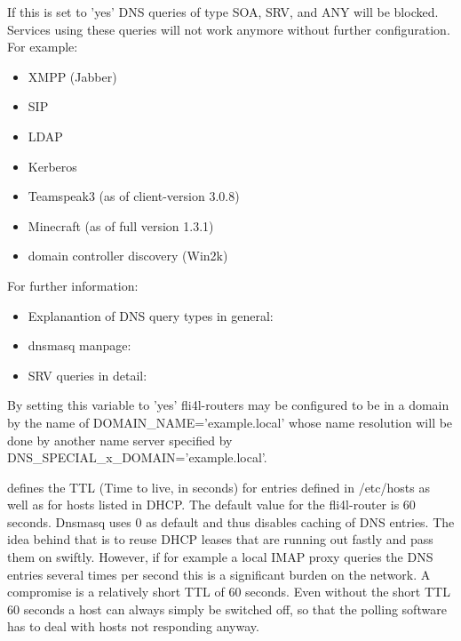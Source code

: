 \begin{description}
     {If this is set to 'yes' DNS queries of type SOA, SRV, and ANY will be
     blocked. Services using these queries will not work anymore without further
     configuration.\hfil\break
     For example:
     \begin{itemize}
     \item XMPP (Jabber)
     \item SIP
     \item LDAP
     \item Kerberos
     \item Teamspeak3 (as of client-version 3.0.8)
     \item Minecraft (as of full version 1.3.1)
     \item domain controller discovery (Win2k)
     \end{itemize}
     For further information:}
     \begin{itemize}
     \item Explanantion of DNS query types in general:\hfil\break
     \item dnsmasq manpage:\hfil\break
     \item SRV queries in detail:\hfil\break
     \end{itemize}


     {By setting this variable to 'yes' fli4l-routers may be configured to be in
     a domain by the name of DOMAIN\_NAME='example.local' whose name resolution will
     be done by another name server specified by DNS\_SPECIAL\_x\_DOMAIN='example.local'.}


     {defines the TTL (Time to live, in seconds) for entries defined
     in /etc/hosts as well as for hosts listed in DHCP. The default value
     for the fli4l-router is 60 seconds. Dnsmasq uses 0 as default and thus
     disables caching of DNS entries. The idea behind that is to reuse DHCP
     leases that are running out fastly and pass them on swiftly.
     However, if for example a local IMAP proxy queries the DNS entries
     several times per second this is a significant burden on the
     network. A compromise is a relatively short TTL of 60
     seconds. Even without the short TTL 60 seconds a host can
     always simply be switched off, so that the polling software
     has to deal with hosts not responding anyway.}


\end{description}

